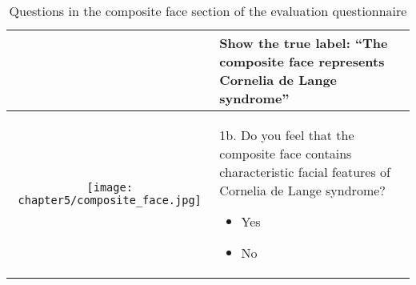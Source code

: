 \documentclass[../report.tex]{subfiles}
\begin{document}
\begin{table}[H]
\begin{tabular}{ | c | m{7cm} |}
\begin{minipage}{.49\textwidth}
    		\vspace*{1cm}
    	\end{minipage}
    	
    	&

    	
    	Show the true label: \enquote{The composite face represents \textbf{Cornelia de Lange syndrome}}
    	
    	
    	\\ \hline
    	\begin{minipage}{.49\textwidth}
    		\vspace*{1cm}
    		\centering
    		\texttt{[image: chapter5/composite\_face.jpg]}
    		\vspace*{1cm}
    	\end{minipage}
    	
    	&
    	1b. Do you feel that the composite face contains characteristic facial features of
    	Cornelia de Lange syndrome?
    	\begin{itemize}
    		\item Yes
    		\item No
    	\end{itemize}
    	
    	\\ \hline
    	\end{tabular}
    	\caption{Questions in the composite face section of the evaluation questionnaire}\label{tbl_comp_face}
    \end{table}
    
    
    
    
    
    
    
    
    
    
\end{document}
